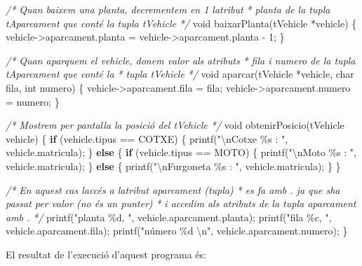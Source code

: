 \documentclass[]{book}
\newenvironment{Shaded}{\begin{snugshade}}{\end{snugshade}}
\newcommand{\CommentTok}[1]{\textcolor[rgb]{0.56,0.35,0.01}{\textit{#1}}}
\newcommand{\ControlFlowTok}[1]{\textcolor[rgb]{0.13,0.29,0.53}{\textbf{#1}}}
\newcommand{\DataTypeTok}[1]{\textcolor[rgb]{0.13,0.29,0.53}{#1}}
\newcommand{\DecValTok}[1]{\textcolor[rgb]{0.00,0.00,0.81}{#1}}
\newcommand{\NormalTok}[1]{#1}
\newcommand{\SpecialCharTok}[1]{\textcolor[rgb]{0.00,0.00,0.00}{#1}}
\newcommand{\StringTok}[1]{\textcolor[rgb]{0.31,0.60,0.02}{#1}}
\begin{document}
\begin{Shaded}
\begin{Highlighting}[]
\CommentTok{/* Quan baixem una planta, decrementem en 1 l\textquotesingle{}atribut}
\CommentTok{ * planta de la tupla tAparcament que conté la tupla tVehicle }
\CommentTok{ */}
\DataTypeTok{void}\NormalTok{ baixarPlanta(tVehicle *vehicle) \{}
\NormalTok{    vehicle{-}\textgreater{}aparcament.planta = vehicle{-}\textgreater{}aparcament.planta {-} }\DecValTok{1}\NormalTok{;}
\NormalTok{\}}

\CommentTok{/* Quan aparquem el vehicle, donem valor als atributs}
\CommentTok{ * fila i numero de la tupla tAparcament que conté la }
\CommentTok{ * tupla tVehicle }
\CommentTok{ */}
\DataTypeTok{void}\NormalTok{ aparcar(tVehicle *vehicle, }\DataTypeTok{char}\NormalTok{ fila, }\DataTypeTok{int}\NormalTok{ numero) \{}
\NormalTok{    vehicle{-}\textgreater{}aparcament.fila = fila;}
\NormalTok{    vehicle{-}\textgreater{}aparcament.numero = numero;}
\NormalTok{\}}

\CommentTok{/* Mostrem per pantalla la posició del tVehicle */} 
\DataTypeTok{void}\NormalTok{ obtenirPosicio(tVehicle vehicle) \{}
    \ControlFlowTok{if}\NormalTok{ (vehicle.tipus == COTXE) \{}
\NormalTok{        printf(}\StringTok{"}\SpecialCharTok{\textbackslash{}n}\StringTok{Cotxe \%s : "}\NormalTok{, vehicle.matricula);}
\NormalTok{    \} }\ControlFlowTok{else}\NormalTok{ \{}
        \ControlFlowTok{if}\NormalTok{ (vehicle.tipus == MOTO) \{}
\NormalTok{            printf(}\StringTok{"}\SpecialCharTok{\textbackslash{}n}\StringTok{Moto \%s : "}\NormalTok{, vehicle.matricula);}
\NormalTok{        \} }\ControlFlowTok{else}\NormalTok{ \{}
\NormalTok{            printf(}\StringTok{"}\SpecialCharTok{\textbackslash{}n}\StringTok{Furgoneta \%s : "}\NormalTok{, vehicle.matricula);}
\NormalTok{        \}}
\NormalTok{    \}}
    
    \CommentTok{/* En aquest cas l\textquotesingle{}accés a l\textquotesingle{}atribut aparcament (tupla)}
\CommentTok{     * es fa amb . ja que s\textquotesingle{}ha passat per valor (no és un punter)}
\CommentTok{     * i accedim als atributs de la tupla aparcament amb . }
\CommentTok{     */}
\NormalTok{    printf(}\StringTok{"planta \%d, "}\NormalTok{, vehicle.aparcament.planta);}
\NormalTok{    printf(}\StringTok{"fila \%c, "}\NormalTok{, vehicle.aparcament.fila);}
\NormalTok{    printf(}\StringTok{"número \%d }\SpecialCharTok{\textbackslash{}n}\StringTok{"}\NormalTok{, vehicle.aparcament.numero);}
\NormalTok{\}}
\end{Highlighting}
\end{Shaded}

El resultat de l'execució d'aquest programa és:
\end{document}
